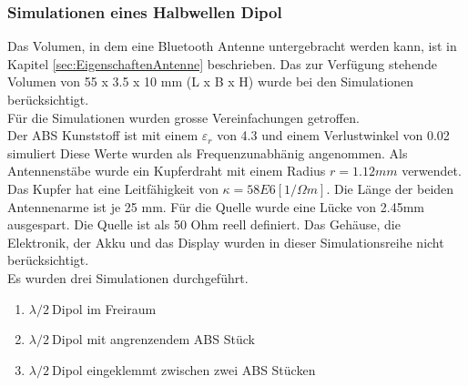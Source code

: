 
\newpage
\subsubsection{Simulationen eines Halbwellen Dipol}\label{sim_lamda2_Dipol}

Das Volumen, in dem eine Bluetooth Antenne untergebracht werden kann, ist in Kapitel \ref{sec:EigenschaftenAntenne} beschrieben. Das zur Verfügung stehende Volumen von 55 x 3.5 x 10 mm (L x B x H) wurde bei den Simulationen berücksichtigt. \\
Für die Simulationen wurden grosse Vereinfachungen getroffen.\\
Der ABS Kunststoff ist mit einem $\varepsilon_r $ von 4.3 und einem Verlustwinkel von 0.02 simuliert Diese Werte wurden als Frequenzunabhänig angenommen. Als Antennenstäbe wurde ein  Kupferdraht mit einem Radius $r = 1.12 mm$ verwendet. Das Kupfer hat eine Leitfähigkeit von $\kappa=58E6 [1/\Omega m]$. Die Länge der beiden Antennenarme ist je 25 mm. Für die Quelle wurde eine Lücke von 2.45mm ausgespart. Die Quelle ist als 50 Ohm reell definiert. Das Gehäuse, die Elektronik, der Akku und das Display wurden in dieser Simulationsreihe nicht berücksichtigt.\\ 
Es wurden drei Simulationen durchgeführt.
\begin{enumerate}
\item  $\lambda/2 \ $Dipol im Freiraum
\item  $\lambda/2 \ $Dipol mit angrenzendem ABS Stück
\item  $\lambda/2 \ $Dipol eingeklemmt zwischen zwei ABS Stücken
\end{enumerate}

